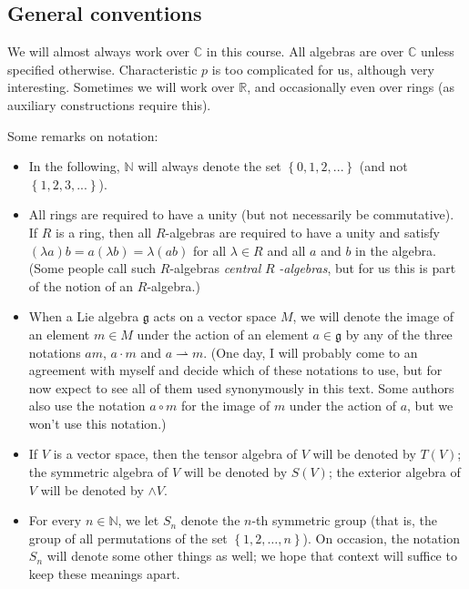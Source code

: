 \documentclass[etingof-lie.tex]{subfiles}
\begin{document}
\subsection{General conventions}

We will almost always work over $\mathbb{C}$ in this course. All algebras are
over $\mathbb{C}$ unless specified otherwise. Characteristic $p$ is too
complicated for us, although very interesting. Sometimes we will work over
$\mathbb{R}$, and occasionally even over rings (as auxiliary constructions
require this).

Some remarks on notation:

\begin{itemize}
\item In the following, $\mathbb{N}$ will always denote the set $\left\{
0,1,2,...\right\}  $ (and not $\left\{  1,2,3,...\right\}  $).

\item All rings are required to have a unity (but not necessarily be
commutative). If $R$ is a ring, then all $R$-algebras are required to have a
unity and satisfy $\left(  \lambda a\right)  b=a\left(  \lambda b\right)
=\lambda\left(  ab\right)  $ for all $\lambda\in R$ and all $a$ and $b$ in the
algebra. (Some people call such $R$-algebras \textit{central }$R$%
\textit{-algebras}, but for us this is part of the notion of an $R$-algebra.)

\item When a Lie algebra $\mathfrak{g}$ acts on a vector space $M$, we will
denote the image of an element $m\in M$ under the action of an element
$a\in\mathfrak{g}$ by any of the three notations $am$, $a\cdot m$ and
$a\rightharpoonup m$. (One day, I will probably come to an agreement with
myself and decide which of these notations to use, but for now expect to see
all of them used synonymously in this text. Some authors also use the notation
$a\circ m$ for the image of $m$ under the action of $a$, but we won't use this notation.)

\item If $V$ is a vector space, then the tensor algebra of $V$ will be denoted
by $T\left(  V\right)  $; the symmetric algebra of $V$ will be denoted by
$S\left(  V\right)  $; the exterior algebra of $V$ will be denoted by $\wedge
V$.

\item For every $n\in\mathbb{N}$, we let $S_{n}$ denote the $n$-th symmetric
group (that is, the group of all permutations of the set $\left\{
1,2,\ldots,n\right\}  $). On occasion, the notation $S_{n}$ will denote some
other things as well; we hope that context will suffice to keep these meanings apart.
\end{itemize}
\end{document}
